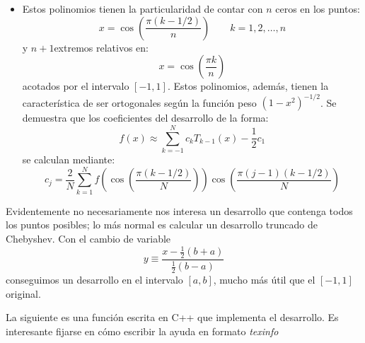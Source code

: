\begin{itemize}
\item Estos polinomios tienen la particularidad de contar con $n$
  ceros en los puntos:
$$x=\cos\left(\frac{\pi(k-1/2)}{n}\right)\qquad
k=1,2,\ldots,n$$ y $n+1$extremos relativos en:
$$  x=\cos\left(\frac{\pi k}{n}\right)$$
acotados por el intervalo $[-1,1]$. Estos polinomios, además, tienen
la característica de ser ortogonales según la función peso
$(1-x^{2})^{-1/2}$.  Se demuestra que los coeficientes del desarrollo
de la forma:
$$
f(x)\approx\sum_{k=-1}^{N}c_{k}T_{k-1}(x)-\frac{1}{2}c_{1}$$ se
calculan mediante:
$$  c_{j}=\frac{2}{N}\sum_{k=1}^{N}f
\left( \cos\left(\frac{\pi(k-1/2)}{N}\right) \right)
\cos\left(\frac{\pi(j-1)(k-1/2)}{N}\right)$$

\end{itemize}
Evidentemente no necesariamente nos interesa un desarrollo que
contenga todos los puntos posibles; lo más normal es calcular un
desarrollo truncado de Chebyshev. Con el cambio de variable$$
y\equiv\frac{x-\frac{1}{2}(b+a)}{\frac{1}{2}(b-a)}$$ conseguimos un
desarrollo en el intervalo $[a,b]$, mucho más útil que el $[-1,1]$
original.

La siguiente es una función escrita en C++ que implementa el
desarrollo.  Es interesante fijarse en cómo escribir la ayuda en
formato \textit{texinfo}

